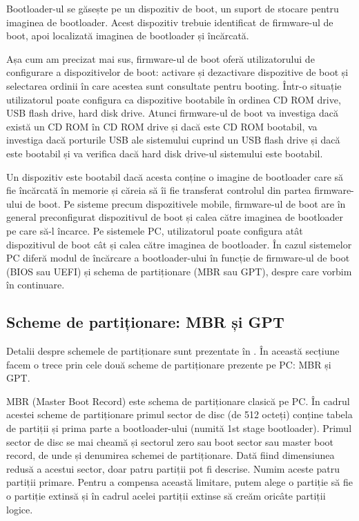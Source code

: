 Bootloader-ul se găsește pe un dispozitiv de boot, un suport de stocare pentru
imaginea de bootloader. Acest dispozitiv trebuie identificat de firmware-ul de
boot, apoi localizată imaginea de bootloader și încărcată.

Așa cum am precizat mai sus, firmware-ul de boot oferă utilizatorului de
configurare a dispozitivelor de boot: activare și dezactivare dispozitive de
boot și selectarea ordinii în care acestea sunt consultate pentru booting.
Într-o situație utilizatorul poate configura ca dispozitive bootabile în ordinea
CD ROM drive, USB flash drive, hard disk drive. Atunci firmware-ul de boot va
investiga dacă există un CD ROM în CD ROM drive și dacă este CD ROM bootabil, va
investiga dacă porturile USB ale sistemului cuprind un USB flash drive și dacă
este bootabil și va verifica dacă hard disk drive-ul sistemului este bootabil.

Un dispozitiv este bootabil dacă acesta conține o imagine de bootloader care să
fie încărcată în memorie și căreia să îi fie transferat controlul din partea
firmware-ului de boot. Pe sisteme precum dispozitivele mobile, firmware-ul de
boot are în general preconfigurat dispozitivul de boot și calea către imaginea
de bootloader pe care să-l încarce. Pe sistemele PC, utilizatorul poate
configura atât dispozitivul de boot cât și calea către imaginea de bootloader.
În cazul sistemelor PC diferă modul de încărcare a bootloader-ului în funcție de
firmware-ul de boot (BIOS sau UEFI) și schema de partiționare (MBR sau GPT),
despre care vorbim în continuare.

\subsection{Scheme de partiționare: MBR și GPT}
\label{sec:boot-bootdev-partscheme}

Detalii despre schemele de partiționare sunt prezentate în
. În această secțiune
facem o trece prin cele două scheme de partiționare prezente pe PC: MBR și GPT.

MBR (Master Boot Record) este schema de partiționare clasică pe PC. În cadrul
acestei scheme de partiționare primul sector de disc (de 512 octeți) conține
tabela de partiții și prima parte a bootloader-ului (numită 1st stage
bootloader). Primul sector de disc se mai cheamă și sectorul zero sau boot
sector sau master boot record, de unde și denumirea schemei de partiționare.
Dată fiind dimensiunea redusă a acestui sector, doar patru partiții pot fi
descrise. Numim aceste patru partiții primare. Pentru a compensa această
limitare, putem alege o partiție să fie o partiție extinsă și în cadrul acelei
partiții extinse să creăm oricâte partiții logice.

